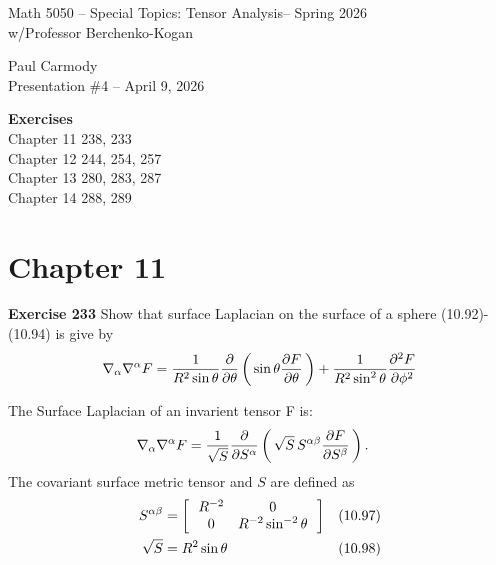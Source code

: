 \documentclass[12pt,a4paper]{report}
\newcommand{\CLASSNAME}{Math 5050 -- Special Topics: Tensor Analysis}
\newcommand{\STUDENTNAME}{Paul Carmody}
\newcommand{\ASSIGNMENT}{Presentation \#4 }
\newcommand{\DUEDATE}{April 9, 2026}
\newcommand{\PROFESSOR}{Professor Berchenko-Kogan}
\newcommand{\SEMESTER}{Spring 2026}
\begin{document}
\begin{center}
	\Large{\CLASSNAME -- \SEMESTER} \\
	\large{ w/\PROFESSOR}
\end{center}
\begin{center}
	\STUDENTNAME \\
	\ASSIGNMENT -- \DUEDATE\\
\end{center} 

\textbf{\large{Exercises}}\\
Chapter 11 238, 233 \\
Chapter 12 244, 254, 257 \\
Chapter 13 280, 283, 287\\
Chapter 14 288, 289\\

\HLINE

\section*{Chapter 11}

\textbf{Exercise 233} Show that surface Laplacian on the surface of a sphere (10.92)-(10.94) is give by 
\begin{align*}
	\nabla_\alpha\nabla^\alpha F = \frac{1}{R^2\sin\theta}\frac{\partial }{\partial \theta}\left (\, \sin\theta\frac{\partial F}{\partial \theta} \,\right )+\frac{1}{R^2\sin^2\theta}\frac{\partial^2 F}{\partial \phi^2}
\end{align*}

The Surface Laplacian of an invarient tensor F is:
\begin{align*}
	\nabla_\alpha\nabla^\alpha F &= \frac{1}{\sqrt{S}}\frac{\partial }{\partial S^\alpha}\left (\, \sqrt{S}\,S^{\alpha\beta}\frac{\partial F}{\partial S^\beta} \,\right ).
\end{align*}The covariant surface metric tensor and $S$ are defined as 
\begin{align*}
	S^{\alpha\beta} &= \left [\,  \begin{array}{c c} R^{-2}&0 \\ 0 & R^{-2}\sin^{-2}\theta \end{array}  \,\right ] & (10.97) \\
	\sqrt{S} &= R^2\sin\theta & (10.98)
\end{align*}
\end{document}
